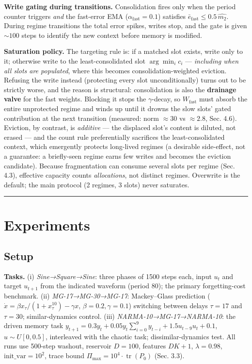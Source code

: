 \documentclass[11pt]{article}
\begin{document}
\textbf{Write gating during transitions.} Consolidation fires only when the
period counter triggers \emph{and} the fast-error EMA
(\(\alpha_{\mathrm{fast}}=0.1\)) satisfies
\(\bar{e}_{\mathrm{fast}} \le 0.5\,\widehat{m_2}\). During regime
transitions the total error spikes, writes stop, and the gate is given
\(\sim 100\) steps to identify the new context before memory is modified.

\textbf{Saturation policy.} The targeting rule is: if a matched slot
exists, write only to it; otherwise write to the least-consolidated
slot \(\arg\min_i c_i\) --- \emph{including when all slots are populated},
where this becomes consolidation-weighted eviction. Refusing the
write instead (protecting every slot unconditionally) turns out to be
strictly worse, and the reason is structural: consolidation is also
the \textbf{drainage valve} for the fast weights. Blocking it stops the
\(\gamma\)-decay, so \(W_{\mathrm{fast}}\) must absorb the entire
unprotected regime and winds up until it drowns the slow slots'
gated contribution at the next transition (measured: norm \(\approx 30\)
vs \(\approx 2.8\), Sec. 4.6). Eviction, by contrast, is \emph{additive} ---
the displaced slot's content is diluted, not erased --- and the count
rule preferentially sacrifices the least-consolidated context, which
emergently protects long-lived regimes (a desirable side-effect, not
a guarantee: a briefly-seen regime earns few writes and becomes the
eviction candidate). Because fragmentation can consume several slots
per regime (Sec. 4.3), effective capacity counts \emph{allocations}, not
distinct regimes. Overwrite is the default; the main protocol
(2 regimes, 3 slots) never saturates.

\begin{center}\rule{0.5\linewidth}{0.5pt}\end{center}

\section{Experiments}\label{experiments}

\subsection{Setup}\label{setup}

\textbf{Tasks.} (i) \emph{Sine→Square→Sine}: three phases of 1500 steps each,
input \(u_t\) and target \(u_{t+1}\) from the indicated waveform (period 80);
the primary forgetting-cost benchmark. (ii) \emph{MG-17→MG-30→MG-17}:
Mackey--Glass prediction (\(\dot{x} = \beta x_\tau/(1+x_\tau^{10}) - \gamma x\),
\(\beta{=}0.2,\gamma{=}0.1\)) switching between delays \(\tau{=}17\) and
\(\tau{=}30\); similar-dynamics control. (iii) \emph{NARMA-10→MG-17→NARMA-10}:
the driven memory task \(y_{t+1} = 0.3y_t + 0.05y_t\sum_{i=0}^{9}y_{t-i}
+ 1.5u_{t-9}u_t + 0.1\), \(u\sim U[0,0.5]\), interleaved with the chaotic
task; dissimilar-dynamics test. All runs use 500-step washout, reservoir
\(D{=}100\), features \(D K{+}1\), \(\lambda{=}0.98\), \(\mathrm{init\_var}
{=}10^{2}\), trace bound \(\Pi_{\max}=10^{4}\cdot\operatorname{tr}(P_0)\)
(Sec. 3.3).
\end{document}
